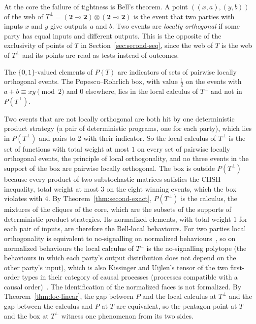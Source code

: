 At the core the failure of tightness is Bell's theorem. A point
$((x, a), (y, b))$ of the web of $T^{\perp} = (\mathbf{2} \multimap
\mathbf{2}) \otimes (\mathbf{2} \multimap \mathbf{2})$ is the event that
two parties with inputs $x$ and $y$ give outputs $a$ and $b$. Two events
are \emph{locally orthogonal} if some party has equal inputs and
different outputs. This is the opposite of the exclusivity of points of
$T$ in Section~\ref{sec:second-seq}, since the web of $T$ is the web of
$T^{\perp}$ and its points are read as tests instead of outcomes.

\begin{theorem}
\label{thm:cat-bell}
The $\{0,1\}$-valued elements of $P(T)$ are indicators of sets of
pairwise locally orthogonal events. The Popescu--Rohrlich box, with value
$\tfrac12$ on the events with $a + b \equiv xy \pmod 2$ and $0$
elsewhere, lies in the local calculus of $T^{\perp}$ and not in
$P(T^{\perp})$.
\end{theorem}

\noindent
Two events that are not locally orthogonal are both hit by one
deterministic product strategy (a pair of deterministic programs, one
for each party), which lies in $P(T^{\perp})$ and pairs to $2$ with
their indicator. So the local calculus of $T^{\perp}$ is the set of
functions with total weight at most $1$ on every set of pairwise
locally orthogonal events, the principle of local orthogonality, and no
three events in the support of the box are pairwise locally orthogonal. The box is
outside $P(T^{\perp})$ because every product of two substochastic
matrices satisfies the CHSH inequality, total weight at most $3$ on the
eight winning events, which the box violates with $4$. By
Theorem~\ref{thm:second-exact}, $P(T^{\perp})$ is the calculus, the
mixtures of the cliques of the core, which are the subsets of the
supports of deterministic product strategies. Its normalized elements,
with total weight $1$ for each pair of inputs, are therefore the
Bell-local behaviours. For two
parties local orthogonality is equivalent to no-signalling on normalized
behaviours~\cite{fritz-lo2013}, so on normalized behaviours the local
calculus of $T^{\perp}$ is the no-signalling polytope (the behaviours
in which each party's output distribution does not depend on the other
party's input), which is also Kissinger and Uijlen's tensor of the two
first-order types in their category of causal processes (processes
compatible with a causal order)~\cite{kissinger-uijlen2019}. The identification
of the normalized faces is not formalized. By
Theorem~\ref{thm:loc-linear}, the gap between $P$ and the local calculus at
$T^{\perp}$ and the gap between the calculus and $P$ at $T$ are equivalent,
so the pentagon point at $T$ and the box at $T^{\perp}$ witness one
phenomenon from its two sides.

